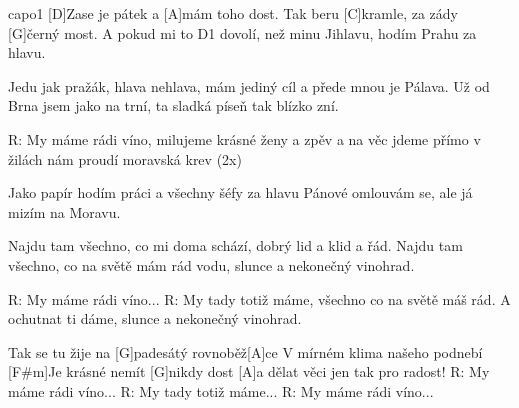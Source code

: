 \hfill capo1
[D]Zase je pátek a [A]mám toho dost.
Tak beru [C]kramle, za zády [G]\null černý most.
A pokud mi to D1 dovolí,
než minu Jihlavu, hodím Prahu za hlavu.

Jedu jak pražák, hlava nehlava,
mám jediný cíl a přede mnou je Pálava.
Už od Brna jsem jako na trní,
ta sladká píseň tak blízko zní.

R:
My máme rádi víno,
milujeme krásné ženy a zpěv
a na věc jdeme přímo
v žilách nám proudí moravská krev (2x)

Jako papír hodím práci a všechny šéfy za hlavu
Pánové omlouvám se, ale já mizím na Moravu.

Najdu tam všechno, co mi doma schází, dobrý lid a klid a řád.
Najdu tam všechno, co na světě mám rád vodu, slunce a nekonečný vinohrad.

R: My máme rádi víno...
R: My tady totiž máme,
všechno co na světě máš rád.
A ochutnat ti dáme,
slunce a nekonečný vinohrad.

Tak se tu žije na [G]padesátý rovnoběž[A]ce
V mírném klima našeho podnebí
[F#m]Je krásné nemít [G]nikdy dost
[A]a dělat věci jen tak pro radost!\columnbreak
R: My máme rádi víno...
R: My tady totiž máme...
R: My máme rádi víno...